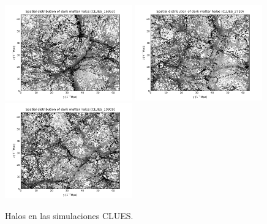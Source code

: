 \begin{figure}[htbp]
	\centering
	\includegraphics[width=0.49\textwidth]
	{./figures/3_nbody_simulations/Halos_Spatial_Distribution(CLUES_16953).png}
	\includegraphics[width=0.49\textwidth]
	{./figures/3_nbody_simulations/Halos_Spatial_Distribution(CLUES_2710).png}
	\includegraphics[width=0.49\textwidth]
	{./figures/3_nbody_simulations/Halos_Spatial_Distribution(CLUES_10909).png}

	\caption{\small{Halos en las simulaciones CLUES.}}
	
	\label{fig:CLUES}
\end{figure}
